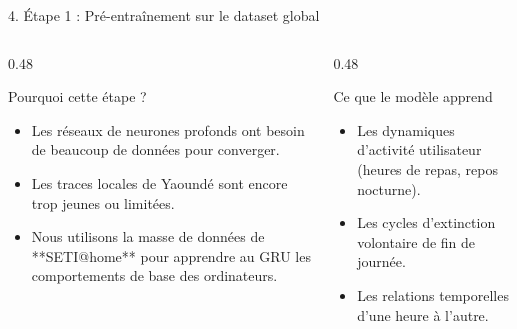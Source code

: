 \documentclass[10pt,aspectratio=169]{beamer}
\begin{document}
\begin{frame}{4. Étape 1 : Pré-entraînement sur le dataset global}
  \begin{columns}[T]
    \begin{column}{0.48\textwidth}
      \begin{block}{Pourquoi cette étape ?}
        \begin{itemize}
          \item Les réseaux de neurones profonds ont besoin de beaucoup de données pour converger.
          \item Les traces locales de Yaoundé sont encore trop jeunes ou limitées.
          \item Nous utilisons la masse de données de **SETI@home** pour apprendre au GRU les comportements de base des ordinateurs.
        \end{itemize}
      \end{block}
    \end{column}
    
    \begin{column}{0.48\textwidth}
      \begin{block}{Ce que le modèle apprend}
        \begin{itemize}
          \item Les dynamiques d'activité utilisateur (heures de repas, repos nocturne).
          \item Les cycles d'extinction volontaire de fin de journée.
          \item Les relations temporelles d'une heure à l'autre.
        \end{itemize}
      \end{block}
    \end{column}
  \end{columns}
\end{frame}
\end{document}

